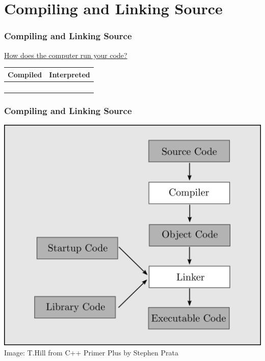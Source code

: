 \documentclass[fleqn]{beamer} %
\newcommand{\sectiontitleIV}{Compiling and Linking Source}
\begin{document}
\section{\sectiontitleIV}	
	\begin{frame}[label=sectionIV] \small
		\frametitle{\sectiontitleIV}    
		
		\underline{How does the computer run your code?} \vspace{5mm}\\
		
		\begin{tabular}{c|c} 
			\textbf{Compiled} \hspace{20mm} & \textbf{Interpreted} \hspace{20mm} \\ \hline
			 \hspace{20mm} &  \hspace{20mm} \\
			 \hspace{20mm} & \hspace{20mm} \\ 
			 \hspace{20mm} &  \hspace{20mm} \\
			 \hspace{20mm} & \hspace{20mm} \\
		
		\end{tabular}


	\end{frame}

	\begin{frame}[label=sectionIV] \small
		\frametitle{\sectiontitleIV}    
		
		\includegraphics[scale=.2]{building_cpp_program.png} \\
		
		\tiny{Image: T.Hill from C++ Primer Plus by Stephen Prata}
		
	\end{frame}
\end{document}
